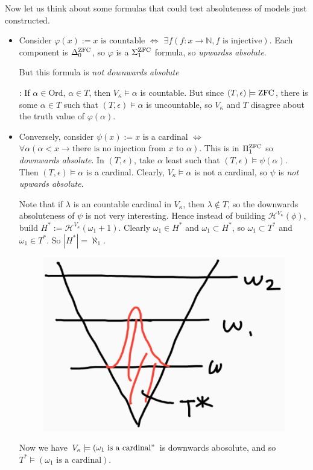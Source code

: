 \documentclass[12pt,a4paper]{article}
\newenvironment{subproof}
{\begin{changemargin}{0.5cm}{0.5cm} 
	}%
	{\end{changemargin}
}
\begin{document}
Now let us think about some formulas that could test absoluteness of models just constructed.
\begin{itemize}
\item Consider $\varphi(x) := x\text{ is countable}$ $\Leftrightarrow$ $\exists f(f: x\rightarrow \mathbb{N}, f \text{ is injective})$. Each component is $\Delta_0^{\text{ZFC}}$, so $\varphi$ is a $\Sigma_1^{\text{ZFC}}$ formula, so \emph{upwardss absolute}.

\quad But this formula is \emph{not downwards absolute}
\begin{subproof}
: If $\alpha \in \text{Ord}$, $\alpha \in T$, then $V_{\kappa} \models \alpha$ is countable. But since $(T, \epsilon) \models \text{ZFC}$, there is some $\alpha \in T$ such that $(T, \epsilon) \models \alpha$ is uncountable, so $V_{\kappa}$ and $T$ disagree about the truth value of $\varphi(\alpha)$.
\end{subproof}

\item Conversely, consider $\psi(x) := x \text{ is a cardinal}$ $\Leftrightarrow$ $\forall \alpha (\alpha < x \rightarrow \text{there is no injection from } x \text{ to } \alpha)$. This is in $\Pi_1^{\text{ZFC}}$ so \emph{downwards absolute}. In $(T, \epsilon)$, take $\alpha$ least such that $(T, \epsilon) \models \psi(\alpha)$. Then $(T, \epsilon) \models \alpha$ is a cardinal. Clearly, $V_{\kappa} \models \alpha$ is not a cardinal, so $\psi$ is \emph{not upwards absolute}.
\s

Note that if $\lambda$ is an countable cardinal in $V_{\kappa}$, then $\lambda \not\in T$, so the downwards absoluteness of $\psi$ is not very interesting. Hence instead of building $\mathcal{H}^{V_{\kappa}}(\phi)$, build $H^* := \mathcal{H}^{V_{\kappa}}(\omega_1 +1)$. Clearly $\omega_1 \in H^*$ and $\omega_1 \subset H^*$, so $\omega_1 \subset T^*$ and $\omega_1 \in T^*$. So $|H^*| = \aleph_1$. 

\begin{figure}[h]
\begin{center}
    \includegraphics[scale=0.25]{7}
\end{center}
\end{figure}

Now we have $V_{\kappa} \models (\omega_1 \text{ is a cardinal}"$ is downwards abosolute, and so $T^* \models (\omega_1 \text{ is a cardinal})$. 
\end{itemize}
\end{document}
